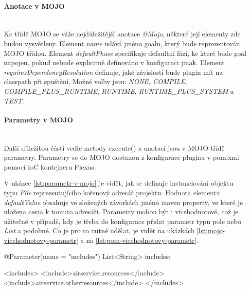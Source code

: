 \documentclass[11pt,twoside,a4paper]{book}
\begin{document}
\paragraph{Anotace v MOJO}
\mbox{}\\

Ke třídě MOJO se váže nejdůležitější anotace {\em @Mojo}, některé její elementy
zde budou vysvětleny. Element {\em name} udává jméno goalu, který bude
reprezentován MOJO třídou.
Element {\em defaultPhase} specifikuje defaultní fázi, ke které bude goal
napojen, pokud nebude explicitně definováno v konfiguraci jinak. Element
{\em requiresDependencyResolution} definuje, jaké závislosti bude plugin mít na
classpath při spuštění. Možné volby jsou: {\em NONE}, {\em COMPILE},
{\em COMPILE\_PLUS\_RUNTIME}, {\em RUNTIME}, {\em RUNTIME\_PLUS\_SYSTEM} a {\em
TEST}.

\paragraph{Parametry v MOJO}
\mbox{}\\

Další důležitou částí vedle metody execute() a anotací jsou v MOJO třídě parametry. Parametry
se do MOJO dostanou z konfigurace pluginu v pom.xml pomocí IoC kontejneru Plexus.


V ukázce \ref{lst:parametr-v-mojo} je vidět, jak se definuje instanciování
objektu typu {\em File} reprezentujícího kořenový adresář projektu. Hodnota
elementu {\em defaultValue} obsahuje ve složených závorkách jméno maven
property, ve které je uložena cesta k tomuto adresáři. Parametry mohou být i
vícehodnotové, což je užitečné v případě, kdy je třeba do konfigurace přidat
parametr typu pole nebo {\em List} a podobné. Co je pro to nutné udělat, je
vidět na ukázkách \ref{lst:mojo-vicehodnotovy-parametr} a na
\ref{lst:pom-vicehodnotovy-parametr}.

\begin{code}[frame=single,caption={Definice vícehodnotového parametru v
Mojo},label={lst:mojo-vicehodnotovy-parametr}] 
@Parameter(name = "includes")
List<String> includes;
\end{code}

\begin{code}[frame=single,caption={Konfigurace vícehodnotového parametru v
pom.xml},label={lst:pom-vicehodnotovy-parametr}] 
<includes>
    <include>airservice.resources</include>
    <include>airservice.otherresources</include>
</includes>
\end{code}
\end{document}
